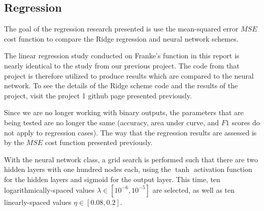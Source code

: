     \subsection{Regression}
        The goal of the regression research presented is use the mean-squared error $MSE$ cost function to compare the Ridge regression and neural network schemes. 

            The linear regression study conducted on Franke's function in this report is nearly identical to the study from our previous project. The code from that project is therefore utilized to produce results which are compared to the neural network. To see the details of the Ridge scheme code and the results of the project, visit the project 1 github page presented previously.
            
            Since we are no longer working with binary outputs, the parameters that are being tested are no longer the same (accuracy, area under curve, and $F1$ scores do not apply to regression cases). The way that the regression results are assessed is by the $MSE$ cost function presented previously. 
            
            With the neural network class, a grid search is performed such that there are two hidden layers with one hundred nodes each, using the $\tanh$ activation function for the hidden layers and sigmoid for the output layer.  This time, ten logarithmically-spaced values $\lambda \in [10^{-6}, 10^{-5}]$ are selected, as well as ten linearly-spaced values $\eta \in [0.08, 0.2]$.